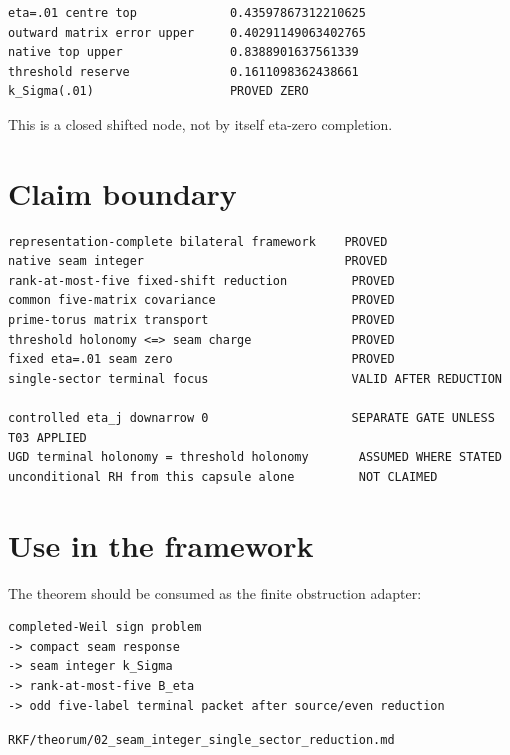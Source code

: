 \begin{verbatim}
eta=.01 centre top             0.43597867312210625
outward matrix error upper     0.40291149063402765
native top upper               0.8388901637561339
threshold reserve              0.1611098362438661
k_Sigma(.01)                   PROVED ZERO
\end{verbatim}

This is a closed shifted node, not by itself eta-zero completion.

\hypertarget{claim-boundary}{%
\section{Claim boundary}\label{claim-boundary}}

\begin{verbatim}
representation-complete bilateral framework    PROVED
native seam integer                            PROVED
rank-at-most-five fixed-shift reduction         PROVED
common five-matrix covariance                   PROVED
prime-torus matrix transport                    PROVED
threshold holonomy <=> seam charge              PROVED
fixed eta=.01 seam zero                         PROVED
single-sector terminal focus                    VALID AFTER REDUCTION

controlled eta_j downarrow 0                    SEPARATE GATE UNLESS T03 APPLIED
UGD terminal holonomy = threshold holonomy       ASSUMED WHERE STATED
unconditional RH from this capsule alone         NOT CLAIMED
\end{verbatim}

\hypertarget{use-in-the-framework}{%
\section{Use in the framework}\label{use-in-the-framework}}

The theorem should be consumed as the finite obstruction adapter:

\begin{verbatim}
completed-Weil sign problem
-> compact seam response
-> seam integer k_Sigma
-> rank-at-most-five B_eta
-> odd five-label terminal packet after source/even reduction
\end{verbatim}

\begin{flushright}\small\texttt{RKF/theorum/02\_seam\_integer\_single\_sector\_reduction.md}\end{flushright}
